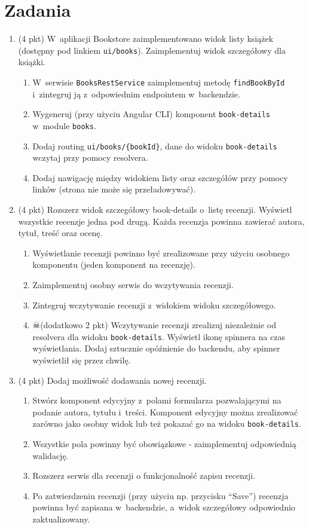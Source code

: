 \documentclass[12pt]{article}
\begin{document}
    \section*{Zadania}
    \begin{enumerate}
	
		\item
			(4 pkt) W~aplikacji Bookstore zaimplementowano widok listy książek (dostępny pod linkiem \texttt{ui/books}). Zaimplementuj widok szczegółowy dla książki.
			\begin{enumerate}
				\item W~serwisie \texttt{BooksRestService} zaimplementuj metodę \texttt{findBookById} i~zintegruj ją z~odpowiednim endpointem w~backendzie.
				\item Wygeneruj (przy użyciu Angular CLI) komponent \texttt{book-details} w~module \texttt{books}.
				\item Dodaj routing \texttt{ui/books/\{bookId\}}, dane do widoku \texttt{book-details} wczytaj przy pomocy resolvera.
				\item Dodaj nawigację między widokiem listy oraz szczegółów przy pomocy linków (strona nie może się przeładowywać).
			\end{enumerate}
			
		\item
			(4 pkt) Rozszerz widok szczegółowy book-details o~listę recenzji. Wyświetl wszystkie recenzje jedna pod drugą. Każda recenzja powinna zawierać autora, tytuł, treść oraz ocenę.
			\begin{enumerate}
				\item Wyświetlanie recenzji powinno być zrealizowane przy użyciu osobnego komponentu (jeden komponent na recenzję).
				\item Zaimplementuj osobny serwis do wczytywania recenzji.
				\item Zintegruj wczytywanie recenzji z~widokiem widoku szczegółowego.
				\item $\skull$(dodatkowo 2 pkt) Wczytywanie recenzji zrealizuj niezależnie od resolvera dla widoku \texttt{book-details}. Wyświetl ikonę spinnera na czas wyświetlania. Dodaj sztucznie opóźnienie do backendu, aby spinner wyświetlił się przez chwilę.
			\end{enumerate}
			
		\item
			(4 pkt) Dodaj możliwość dodawania nowej recenzji.
			\begin{enumerate}
				\item Stwórz komponent edycyjny z~polami formularza pozwalającymi na podanie autora, tytułu i~treści. Komponent edycyjny można zrealizować zarówno jako osobny widok lub też pokazać go na widoku \texttt{book-details}.
				\item Wszystkie pola powinny być obowiązkowe - zaimplementuj odpowiednią walidację.
				\item Rozszerz serwis dla recenzji o funkcjonalność zapisu recenzji.
				\item Po zatwierdzeniu recenzji (przy użyciu np. przycisku ``Save'') recenzja powinna być zapisana w~backendzie, a~widok szczegółowy odpowiednio zaktualizowany.
			\end{enumerate}
			

\end{enumerate}
\end{document}
